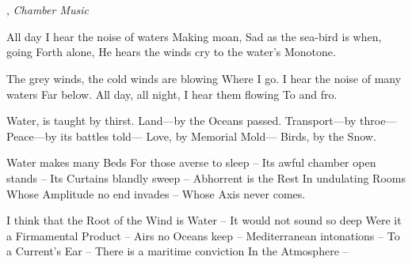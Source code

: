 \documentclass[12pt, letterpaper]{report}
\begin{document}
\chapter{}


\author{James Joyce}, \textit{Chamber Music}

\begin{poem}
\begin{stanza}
All day I hear the noise of waters\verseline
Making moan,\verseline
Sad as the sea-bird is when, going\verseline
Forth alone,\verseline
He hears the winds cry to the water’s\verseline
Monotone.
\end{stanza}
\begin{stanza}
The grey winds, the cold winds are blowing\verseline
Where I go.\verseline
I hear the noise of many waters\verseline
Far below.\verseline
All day, all night, I hear them flowing\verseline
To and fro.
\end{stanza}
\end{poem}

\clearpage

\author{Emily Dickinson}

\begin{poem}
\begin{stanza}
Water, is taught by thirst.\verseline
Land---by the Oceans passed.\verseline
Transport---by throe---\verseline
Peace---by its battles told---\verseline
Love, by Memorial Mold---\verseline
Birds, by the Snow.
\end{stanza}
\end{poem}

\author{Emily Dickinson}

\begin{poem}
\begin{stanza}
Water makes many Beds\verseline
For those averse to sleep --\verseline
Its awful chamber open stands --\verseline
Its Curtains blandly sweep --\verseline
Abhorrent is the Rest\verseline
In undulating Rooms\verseline
Whose Amplitude no end invades --\verseline
Whose Axis never comes.
\end{stanza}
\end{poem}

\author{by Emily Dickinson}

\begin{poem}
\begin{stanza}
I think that the Root of the Wind is Water --\verseline
It would not sound so deep\verseline
Were it a Firmamental Product --\verseline
Airs no Oceans keep --\verseline
Mediterranean intonations --\verseline
To a Current's Ear --\verseline
There is a maritime conviction\verseline
In the Atmosphere --
\end{stanza}
\end{poem}
\end{document}
